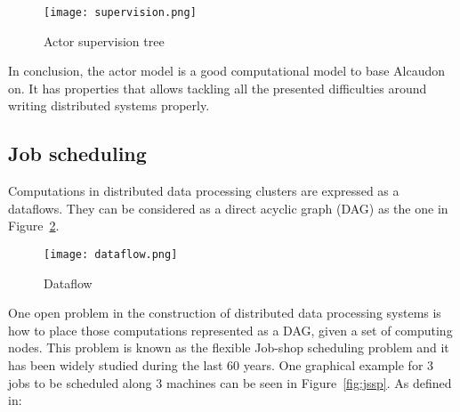 \begin{figure}[!h]
\begin{center}
\texttt{[image: supervision.png]}
\caption{Actor supervision tree}
\label{fig:supervision}
\end{center}
\end{figure}

In conclusion, the actor model is a good computational model to base Alcaudon
on. It has properties that allows tackling all the presented difficulties around
writing distributed systems properly.

\subsection{Job scheduling}

Computations in distributed data processing clusters are expressed as a
dataflows. They can be considered as a direct acyclic graph (DAG) as the one in
Figure~\ref{fig:dataflow}.

\begin{figure}[h!]
\begin{center}
\texttt{[image: dataflow.png]}
\caption{Dataflow}
\label{fig:dataflow}
\end{center}
\end{figure}

One open problem in the construction of distributed data processing systems is
how to place those computations represented as a DAG, given a set of computing
nodes. This problem is known as the flexible Job-shop scheduling problem and it
has been widely studied during the last 60 years. One graphical example for $3$
jobs to be scheduled along $3$ machines can be seen in Figure~\ref{fig:jssp}.
As defined in\cite{jobshop2}:

